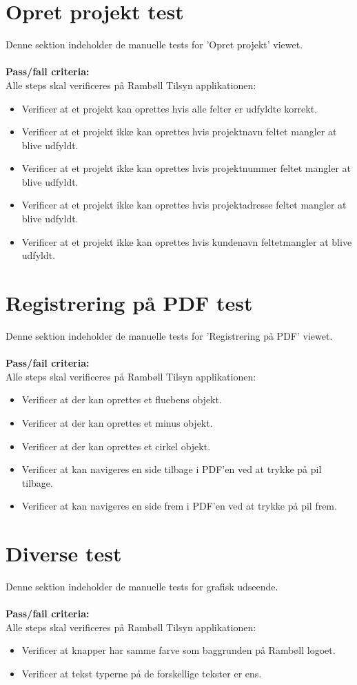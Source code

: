 \section{Opret projekt test}
Denne sektion indeholder de manuelle tests for 'Opret projekt' viewet. \\ \\
\textbf{Pass/fail criteria:} \\
Alle steps skal verificeres på Rambøll Tilsyn applikationen:
\begin{itemize}[-]
	\item Verificer at et projekt kan oprettes hvis alle felter er udfyldte korrekt.
	\item Verificer at et projekt ikke kan oprettes hvis projektnavn feltet mangler at blive udfyldt.
	\item Verificer at et projekt ikke kan oprettes hvis projektnummer feltet mangler at blive udfyldt.
	\item Verificer at et projekt ikke kan oprettes hvis projektadresse feltet mangler at blive udfyldt.
	\item Verificer at et projekt ikke kan oprettes hvis kundenavn feltetmangler at blive udfyldt. \\
\end{itemize}

\section{Registrering på PDF test}
Denne sektion indeholder de manuelle tests for 'Registrering på PDF' viewet. \\ \\
\textbf{Pass/fail criteria:} \\
Alle steps skal verificeres på Rambøll Tilsyn applikationen:
\begin{itemize}[-]
	\item Verificer at der kan oprettes et fluebens objekt.
	\item Verificer at der kan oprettes et minus objekt.
	\item Verificer at der kan oprettes et cirkel objekt.
	\item Verificer at kan navigeres en side tilbage i PDF'en ved at trykke på pil tilbage.
	\item Verificer at kan navigeres en side frem i PDF'en ved at trykke på pil frem. \\
\end{itemize}

\section{Diverse test}
Denne sektion indeholder de manuelle tests for grafisk udseende. \\ \\
\textbf{Pass/fail criteria:} \\
Alle steps skal verificeres på Rambøll Tilsyn applikationen:
\begin{itemize}[-]
	\item Verificer at knapper har samme farve som baggrunden på Rambøll logoet.
	\item Verificer at tekst typerne på de forskellige tekster er ens.
\end{itemize}